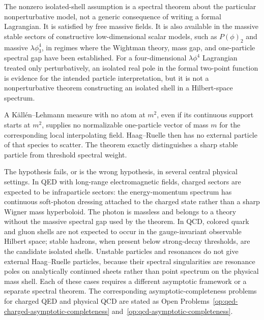 \begin{remark}
\label{rem:haag-ruelle-isolated-shell-scope}
The nonzero isolated-shell assumption is a spectral theorem about the
particular nonperturbative model, not a generic consequence of writing a formal
Lagrangian.  It is satisfied by free massive fields.  It is also available in
the massive stable sectors of constructive low-dimensional scalar models, such
as \(P(\phi)_2\) and massive \(\lambda\phi^4_3\), in regimes where the
Wightman theory, mass gap, and one-particle spectral gap have been established.
For a four-dimensional \(\lambda\phi^4\) Lagrangian treated only
perturbatively, an isolated real pole in the formal two-point function is
evidence for the intended particle interpretation, but it is not a
nonperturbative theorem constructing an isolated shell in a Hilbert-space
spectrum.

A K\"all\'en--Lehmann measure with no atom at \(m^2\), even if its continuous
support starts at \(m^2\), supplies no normalizable one-particle vector of mass
\(m\) for the corresponding local interpolating field.  Haag--Ruelle then has
no external particle of that species to scatter.  The theorem exactly
distinguishes a sharp stable particle from threshold spectral weight.

The hypothesis fails, or is the wrong hypothesis, in several central physical
settings.  In QED with long-range electromagnetic fields, charged sectors are
expected to be infraparticle sectors: the energy-momentum spectrum has
continuous soft-photon dressing attached to the charged state rather than a
sharp Wigner mass hyperboloid.  The photon is massless and belongs to a theory
without the massive spectral gap used by the theorem.  In QCD, colored quark
and gluon shells are not expected to occur in the gauge-invariant observable
Hilbert space; stable hadrons, when present below strong-decay thresholds, are
the candidate isolated shells.  Unstable particles and resonances do not give
external Haag--Ruelle particles, because their spectral singularities are
resonance poles on analytically continued sheets rather than point spectrum on
the physical mass shell.  Each of these cases requires a different asymptotic
framework or a separate spectral theorem.  The corresponding
asymptotic-completeness problems for charged QED and physical QCD are stated
as Open Problems~\ref{op:qed-charged-asymptotic-completeness}
and~\ref{op:qcd-asymptotic-completeness}.
\end{remark}

